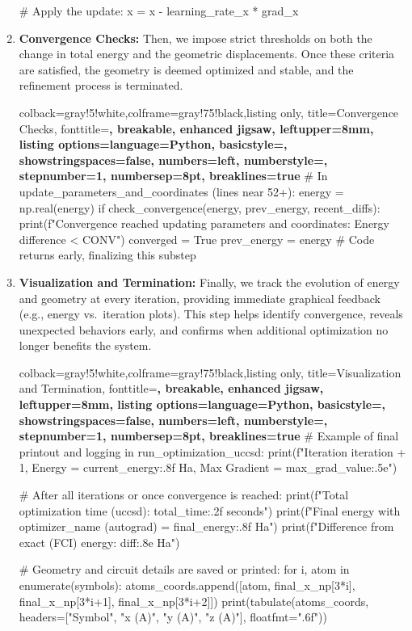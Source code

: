 \begin{enumerate}
\begin{tcblisting}
# Apply the update:
x = x - learning_rate_x * grad_x
    \end{tcblisting}

    \item \textbf{Convergence Checks:}
    Then, we impose strict thresholds on both the change in total energy and the geometric displacements. Once these criteria are satisfied, the geometry is deemed optimized and stable, and the refinement process is terminated.
    \begin{tcblisting}{colback=gray!5!white,colframe=gray!75!black,listing only,
        title=Convergence Checks, fonttitle=\bfseries, breakable, enhanced jigsaw, leftupper=8mm,
        listing options={language=Python, basicstyle=\ttfamily\small,
        showstringspaces=false, numbers=left, numberstyle=\footnotesize,
        stepnumber=1, numbersep=8pt, breaklines=true}}
# In update_parameters_and_coordinates (lines near 52+):
energy = np.real(energy)
if check_convergence(energy, prev_energy, recent_diffs):
    print(f"Convergence reached updating parameters and coordinates: Energy difference < {CONV}")
    converged = True
    prev_energy = energy
    # Code returns early, finalizing this substep

    \end{tcblisting}

    \item \textbf{Visualization and Termination:}
    Finally, we track the evolution of energy and geometry at every iteration, providing immediate graphical feedback (e.g., energy vs.\ iteration plots). This step helps identify convergence, reveals unexpected behaviors early, and confirms when additional optimization no longer benefits the system.
    \begin{tcblisting}{colback=gray!5!white,colframe=gray!75!black,listing only,
        title=Visualization and Termination, fonttitle=\bfseries, breakable, enhanced jigsaw, leftupper=8mm,
        listing options={language=Python, basicstyle=\ttfamily\small,
        showstringspaces=false, numbers=left, numberstyle=\footnotesize,
        stepnumber=1, numbersep=8pt, breaklines=true}}
# Example of final printout and logging in run_optimization_uccsd:
print(f"Iteration {iteration + 1}, Energy = {current_energy:.8f} Ha, Max Gradient = {max_grad_value:.5e}")

# After all iterations or once convergence is reached:
print(f"Total optimization time (uccsd): {total_time:.2f} seconds")
print(f"Final energy with {optimizer_name} (autograd) = {final_energy:.8f} Ha")
print(f"Difference from exact (FCI) energy: {diff:.8e} Ha")

# Geometry and circuit details are saved or printed:
for i, atom in enumerate(symbols):
    atoms_coords.append([atom, final_x_np[3*i], final_x_np[3*i+1], final_x_np[3*i+2]])
print(tabulate(atoms_coords, headers=["Symbol", "x (A)", "y (A)", "z (A)"], floatfmt=".6f"))
    \end{tcblisting}
\end{enumerate}


